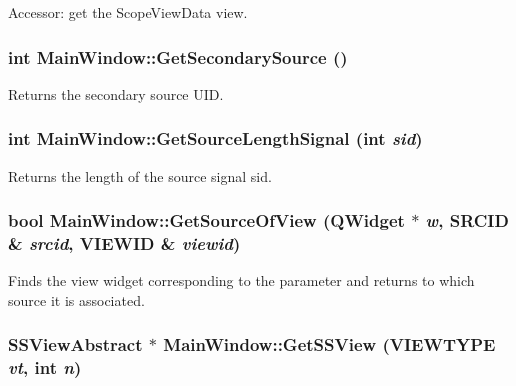 Accessor: get the ScopeViewData view. 

\hypertarget{class_main_window_7d9bdb92e89ed9711ca33d683a93e72f}{
\subsubsection[{GetSecondarySource}]{\setlength{\rightskip}{0pt plus 5cm}int MainWindow::GetSecondarySource ()}}
\label{class_main_window_7d9bdb92e89ed9711ca33d683a93e72f}


Returns the secondary source UID. 

\hypertarget{class_main_window_244cdded6367e002219f5d44bbb07953}{
\subsubsection[{GetSourceLengthSignal}]{\setlength{\rightskip}{0pt plus 5cm}int MainWindow::GetSourceLengthSignal (int {\em sid})}}
\label{class_main_window_244cdded6367e002219f5d44bbb07953}


Returns the length of the source signal sid. 

\hypertarget{class_main_window_85941a865aac37aa9ab8a20dc7d618e4}{
\subsubsection[{GetSourceOfView}]{\setlength{\rightskip}{0pt plus 5cm}bool MainWindow::GetSourceOfView (QWidget $\ast$ {\em w}, \/  {\bf SRCID} \& {\em srcid}, \/  {\bf VIEWID} \& {\em viewid})}}
\label{class_main_window_85941a865aac37aa9ab8a20dc7d618e4}


Finds the view widget corresponding to the parameter and returns to which source it is associated. 

\hypertarget{class_main_window_d4dc49b2142db966c0409d91914f47b4}{
\subsubsection[{GetSSView}]{\setlength{\rightskip}{0pt plus 5cm}SSViewAbstract $\ast$ MainWindow::GetSSView ({\bf VIEWTYPE} {\em vt}, \/  int {\em n})}}
\label{class_main_window_d4dc49b2142db966c0409d91914f47b4}


